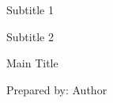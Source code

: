 \begingroup
\thispagestyle{empty}
\par\sffamily\selectfont
\begin{center}
\color{white}
{\fontsize{15pt}{0}\selectfont
Subtitle 1
\par
\vspace*{.2cm}
Subtitle 2
\par
}
\vspace*{2.7cm}
{\fontsize{90pt}{0}\selectfont
Main Title 
\par
}
\color{white}
\vspace*{16cm}
{\fontsize{20pt}{0}\selectfont
 Prepared by: Author
 \par
}
\end{center}
\endgroup